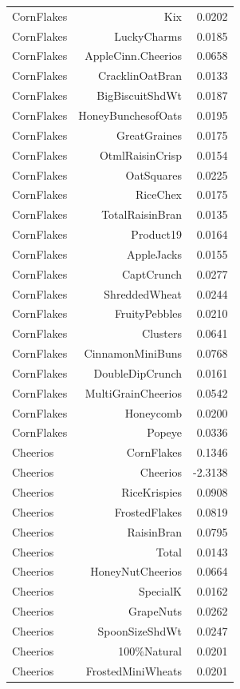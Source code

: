\begin{longtable}{@{}lrr@{}}
CornFlakes & Kix & 0.0202 \\
CornFlakes & LuckyCharms & 0.0185 \\
CornFlakes & AppleCinn.Cheerios & 0.0658 \\
CornFlakes & CracklinOatBran & 0.0133 \\
CornFlakes & BigBiscuitShdWt & 0.0187 \\
CornFlakes & HoneyBunchesofOats & 0.0195 \\
CornFlakes & GreatGraines & 0.0175 \\
CornFlakes & OtmlRaisinCrisp & 0.0154 \\
CornFlakes & OatSquares & 0.0225 \\
CornFlakes & RiceChex & 0.0175 \\
CornFlakes & TotalRaisinBran & 0.0135 \\
CornFlakes & Product19 & 0.0164 \\
CornFlakes & AppleJacks & 0.0155 \\
CornFlakes & CaptCrunch & 0.0277 \\
CornFlakes & ShreddedWheat & 0.0244 \\
CornFlakes & FruityPebbles & 0.0210 \\
CornFlakes & Clusters & 0.0641 \\
CornFlakes & CinnamonMiniBuns & 0.0768 \\
CornFlakes & DoubleDipCrunch & 0.0161 \\
CornFlakes & MultiGrainCheerios & 0.0542 \\
CornFlakes & Honeycomb & 0.0200 \\
CornFlakes & Popeye & 0.0336 \\
Cheerios & CornFlakes & 0.1346 \\
Cheerios & Cheerios & -2.3138 \\
Cheerios & RiceKrispies & 0.0908 \\
Cheerios & FrostedFlakes & 0.0819 \\
Cheerios & RaisinBran & 0.0795 \\
Cheerios & Total & 0.0143 \\
Cheerios & HoneyNutCheerios & 0.0664 \\
Cheerios & SpecialK & 0.0162 \\
Cheerios & GrapeNuts & 0.0262 \\
Cheerios & SpoonSizeShdWt & 0.0247 \\
Cheerios & 100\%Natural & 0.0201 \\
Cheerios & FrostedMiniWheats & 0.0201 \\

\end{longtable}

